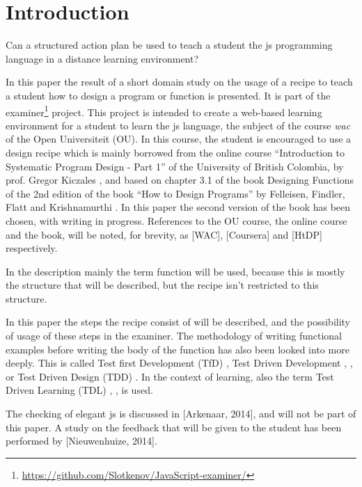 \section{Introduction}

Can a structured action plan be used to teach a \gls{student} the \gls{js}
programming language in a distance learning environment?

In this paper the result of a short domain study on the usage of a recipe to
teach a \gls{student} how to design a program or function is presented.
It is part of the \gls{examiner}\footnote{\url{https://github.com/Slotkenov/JavaScript-examiner/}} project.
This project is intended to create a web-based learning environment for a \gls{student}
to learn the \gls{js} language, the subject of the course {\em \gls{wac}} of the Open Universiteit (OU).
In this course, the \gls{student} is encouraged to use a design recipe which is mainly
borrowed from the online course ``Introduction to Systematic Program Design - Part 1''
of the University of British Colombia, by prof. Gregor Kiczales
\citep{kiczales_introduction_2015},
and based on chapter 3.1 of the book Designing Functions of the 2nd edition of the book
``How to Design Programs'' by Felleisen, Findler, Flatt and Krishnamurthi
\citep{felleisen_how_2015}.
In this paper the second version of the book has been chosen, with writing
in progress. References to the OU course, the online course and the book, will
be noted, for brevity, as [WAC], [Coursera] and [HtDP] respectively.

In the description mainly the term function will be used, because this is mostly
the structure that will be described, but the recipe isn't restricted to this
structure.

In this paper the steps the recipe consist of will be described, and the
possibility of usage of these steps in the \gls{examiner}.
The methodology of writing functional examples before writing the body of the function has also been looked into more deeply.
This is called Test first Development (TfD) \citep{langr_evolution_2001}, Test Driven Development
\citep{edwards_rethinking_2003}, \citep{janzen_test-driven_2008}, \citep{sommerville_software_2011} or Test Driven Design (TDD) \citep{proulx_test-driven_2009}.
In the context of learning, also the term Test Driven Learning (TDL) \citep{janzen_test-driven_2006},
\citep{proulx_test-driven_2009}, \citep{janzen_test-driven_2008} is used.

The checking of elegant \gls{js} is discussed in [Arkenaar, 2014], and will
not be part of this paper.
A study on the feedback that will be given to the \gls{student} has been performed by
[Nieuwenhuize, 2014].

